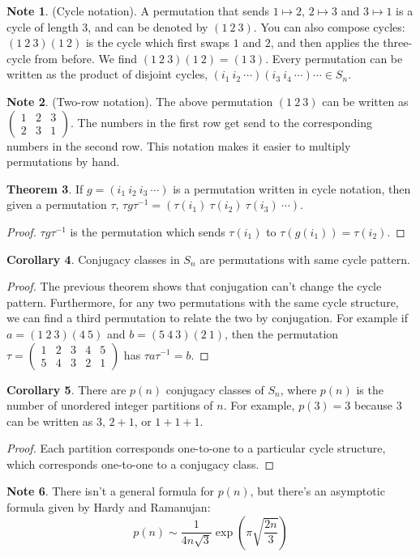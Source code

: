 \documentclass[12pt, letterpaper]{article}
\theoremstyle{definition} %
\newtheorem{thm}{Theorem}[section] %
\newtheorem{cor}[thm]{Corollary}
\newtheorem{note}[thm]{Note}
\begin{document}
\begin{note} (Cycle notation). A permutation that sends $1\mapsto 2$, $2\mapsto 3$ and $3\mapsto 1$ is a cycle of length 3, and 
  can be denoted by $(1\ 2\ 3)$. You can also compose cycles: $(1\ 2\ 3)(1\ 2)$ is the cycle which first swaps $1$ and $2$, 
  and then applies the three-cycle from before. We find $(1\ 2\ 3)(1\ 2)=(1\ 3)$. Every permutation can be written as the product of disjoint cycles,
  $(i_1\ i_2\ \cdots)(i_3\ i_4\ \cdots)\cdots\in S_n$.
\end{note}
\begin{note} (Two-row notation). The above permutation $(1\ 2\ 3)$ can be written as $\begin{pmatrix} 1 & 2 & 3 \\ 2 & 3 & 1\end{pmatrix}$. The numbers
  in the first row get send to the corresponding numbers in the second row. This notation makes it easier to multiply permutations by hand.
\end{note}
\begin{thm}
  If $g=(i_1\ i_2\ i_3\ \cdots)$ is a permutation written in cycle notation, then given a permutation $\tau$,  
  $\tau g \tau^{-1}=(\tau(i_1)\ \tau(i_2)\ \tau(i_3)\ \cdots)$. 
\end{thm}
\begin{proof}
  $\tau g \tau^{-1}$ is the permutation which sends $\tau(i_1)$ to $\tau( g(i_1))=\tau(i_2)$.
\end{proof}
\begin{cor}
  Conjugacy classes in $S_n$ are permutations with same cycle pattern.
\end{cor}
\begin{proof}
  The previous theorem shows that conjugation can't change the cycle pattern. Furthermore, for any two permutations with the same cycle structure, we can 
  find a third permutation to relate the two by conjugation. For example if $a=(1\ 2\ 3)(4\ 5)$ and $b=(5\ 4\ 3)(2\ 1)$, then the permutation 
  $\tau=\begin{pmatrix} 1 & 2 & 3 & 4 & 5 \\ 5 & 4 & 3 & 2 & 1 \end{pmatrix}$ has $\tau a \tau^{-1}=b$.
\end{proof}
\begin{cor}
  There are $p(n)$ conjugacy classes of $S_n$, where $p(n)$ is the number of unordered integer partitions of $n$.
  For example, $p(3)=3$ because $3$ can be written as $3$, $2+1$, or $1+1+1$. 
\end{cor}
\begin{proof}
  Each partition corresponds one-to-one to a particular cycle structure, 
  which corresponds one-to-one to a conjugacy class. 
\end{proof}
\begin{note}
  There isn't a general formula for $p(n)$, but there's
  an asymptotic formula given by Hardy and Ramanujan:
\begin{equation*}
  p(n)\sim \frac{1}{4 n \sqrt{3}} \exp \left(\pi \sqrt{\frac{2n}{3}}\right)
\end{equation*}
\end{note}
\end{document}
